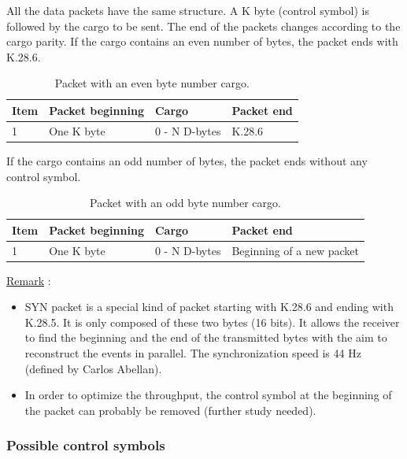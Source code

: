 All the data packets have the same structure. A K byte (control symbol) is followed by the cargo to be sent. The end of the packets changes according to the cargo parity.\newline
If the cargo contains an even number of bytes, the packet ends with K.28.6.

\begin{table} [!htbp]
\centering
\caption{Packet with an even byte number cargo.}
\label{chapappA::tab::EvenCargo}
\begin{tabular}{m{1.5cm} M{2.5cm} M{2.5cm} M{4cm}}
\toprule
{}
\textbf{Item}  	&\textbf{Packet beginning}		&\textbf{Cargo} 	&\textbf{Packet end}\\
				& One K byte 					& 0 - N D-bytes		& K.28.6	\\
\bottomrule
\end{tabular}
\end{table}

If the cargo contains an odd number of bytes, the packet ends without any control symbol.

\begin{table} [!htbp]
\centering
\caption{Packet with an odd byte number cargo.}
\label{chapappA::tab::OddCargo}
\begin{tabular}{m{1.5cm} M{2.5cm} M{2.5cm} M{4cm}}
\toprule
{}
\textbf{Item}  	&\textbf{Packet beginning}		&\textbf{Cargo} 	&\textbf{Packet end}\\
				& One K byte						& 0 - N D-bytes		& Beginning of a new packet	\\
\bottomrule
\end{tabular}
\end{table}

\underline{Remark} :
	\begin{itemize}
		\item SYN packet is a special kind of packet starting with K.28.6 and ending with K.28.5. It is only composed of these two bytes (16 bits). It allows the receiver to find the beginning and the end of the transmitted bytes with the aim to reconstruct the events in parallel. The synchronization speed is 44 Hz (defined by Carlos Abellan).
		\item In order to optimize the throughput, the control symbol at the beginning of the packet can probably be removed (further study needed).
		\end{itemize}



\subsubsection{Possible control symbols}\label{chapappA::subsubsec::ctrlSymbols}

